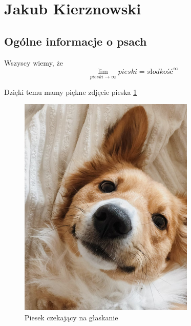 \section{Jakub Kierznowski}
\label{sec:kierzno}
%




\subsection{Ogólne informacje o psach}
Wszyscy wiemy, że
\[ \lim_{pieski \to\infty} pieski = słodkość ^\infty \]



Dzięki temu mamy piękne zdjęcie pieska \ref{fig:pies}


\begin{figure}[htbp]
    \centering
    \includegraphics[scale=1, angle=90, width=\textwidth]{pictures/dog.png}
    \caption{Piesek czekający na głaskanie}
    \label{fig:pies}
\end{figure}


